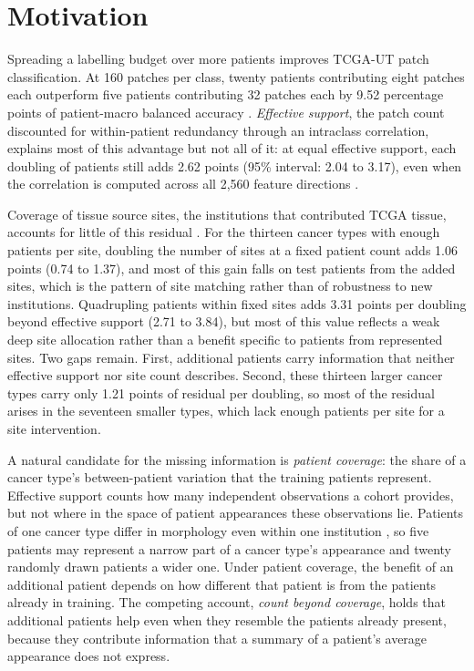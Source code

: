 \documentclass[11pt]{article}
\begin{document}
\section{Motivation}
\label{sec:motivation}
Spreading a labelling budget over more patients improves TCGA-UT patch classification. At 160 patches per class, twenty patients contributing eight patches each outperform five patients contributing 32 patches each by 9.52 percentage points of patient-macro balanced accuracy \citep{queisler2026effectiveSupport}. \emph{Effective support}, the patch count discounted for within-patient redundancy through an intraclass correlation, explains most of this advantage but not all of it: at equal effective support, each doubling of patients still adds 2.62 points (95\% interval: 2.04 to 3.17), even when the correlation is computed across all 2,560 feature directions \citep{queisler2026multidirectionalRedundancy}.

Coverage of tissue source sites, the institutions that contributed TCGA tissue, accounts for little of this residual \citep{queisler2026siteCoverage}. For the thirteen cancer types with enough patients per site, doubling the number of sites at a fixed patient count adds 1.06 points (0.74 to 1.37), and most of this gain falls on test patients from the added sites, which is the pattern of site matching rather than of robustness to new institutions. Quadrupling patients within fixed sites adds 3.31 points per doubling beyond effective support (2.71 to 3.84), but most of this value reflects a weak deep site allocation rather than a benefit specific to patients from represented sites. Two gaps remain. First, additional patients carry information that neither effective support nor site count describes. Second, these thirteen larger cancer types carry only 1.21 points of residual per doubling, so most of the residual arises in the seventeen smaller types, which lack enough patients per site for a site intervention.

A natural candidate for the missing information is \emph{patient coverage}: the share of a cancer type's between-patient variation that the training patients represent. Effective support counts how many independent observations a cohort provides, but not where in the space of patient appearances these observations lie. Patients of one cancer type differ in morphology even within one institution \citep{komura2022universalEncoding}, so five patients may represent a narrow part of a cancer type's appearance and twenty randomly drawn patients a wider one. Under patient coverage, the benefit of an additional patient depends on how different that patient is from the patients already in training. The competing account, \emph{count beyond coverage}, holds that additional patients help even when they resemble the patients already present, because they contribute information that a summary of a patient's average appearance does not express.
\end{document}
